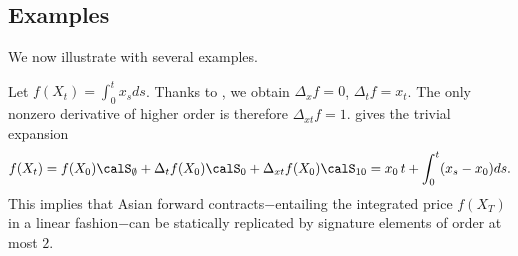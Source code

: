  


\subsection{Examples}
 We now illustrate  with several examples. 
\begin{example}
%     
  Let $f(X_t) = \int_0^t x_s ds$. Thanks to , we obtain $\Delta_x f =0$, $\Delta_t f = x_t$. The only nonzero derivative of higher order is therefore $\Delta_{xt}f=1$.
  gives the trivial expansion
    $$f(X_t) = f(X_0) \calS_{\emptyset} + \Delta_t f(X_0) \calS_{0} + \Delta_{xt} f(X_0) \calS_{10} = x_0 \, t + \int_0^t (x_s - x_0)ds. $$
    This implies that Asian forward contracts$-$entailing the integrated price $f(X_T)$ in a linear fashion$-$can be statically replicated by signature elements of order at most $2$.
\end{example}

